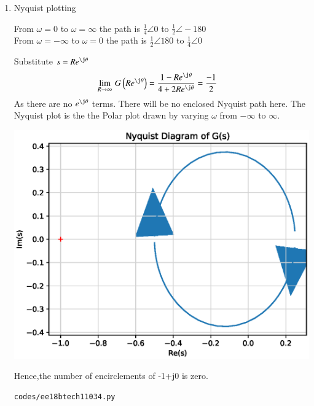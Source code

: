 \begin{enumerate}[label=\thesection.\arabic*.,ref=\thesection.\theenumi]
\item Nyquist plotting\\
\solution

From $\omega = 0$ to $\omega = \infty$ the path is
$\frac{1}{4}\angle0$ to $\frac{1}{2}\angle-180$
\\
From $\omega = -\infty$ to $\omega = 0$ the path is
$\frac{1}{2}\angle180$ to $\frac{1}{4}\angle0$

Substitute $s = Re^{\j\theta}$
\begin{align}
\lim_{R\to \infty}\,G\brak{Re^{\j\theta}} &= \frac{1-Re^{\j\theta}}{4+2Re^{\j\theta}}=\frac{-1}{2}  
\end{align}
As there are no $e^{\j\theta}$ terms.
There will be no enclosed Nyquist path here.
The Nyquist plot is the the Polar plot drawn by varying $\omega$ from $-\infty$ to $\infty$.

\includegraphics[width=\columnwidth]{./figs/ee18btech11034.eps}

Hence,the number of encirclements of -1+j0 is zero.\\
\begin{lstlisting}
codes/ee18btech11034.py
\end{lstlisting}
\end{enumerate}
